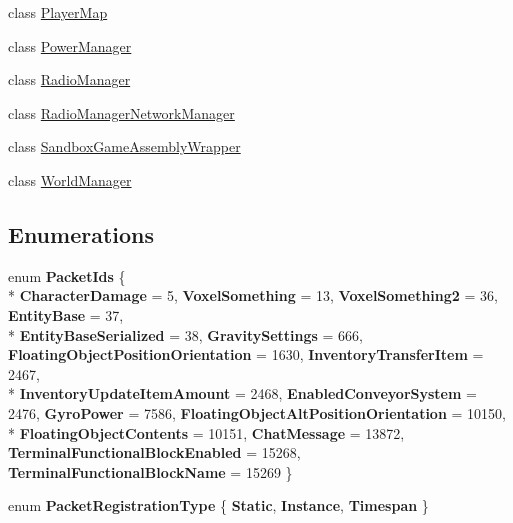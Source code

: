 \begin{DoxyCompactItemize}
\item 
class \hyperlink{class_s_e_mod_a_p_i_internal_1_1_a_p_i_1_1_common_1_1_player_map}{Player\+Map}
\item 
class \hyperlink{class_s_e_mod_a_p_i_internal_1_1_a_p_i_1_1_common_1_1_power_manager}{Power\+Manager}
\item 
class \hyperlink{class_s_e_mod_a_p_i_internal_1_1_a_p_i_1_1_common_1_1_radio_manager}{Radio\+Manager}
\item 
class \hyperlink{class_s_e_mod_a_p_i_internal_1_1_a_p_i_1_1_common_1_1_radio_manager_network_manager}{Radio\+Manager\+Network\+Manager}
\item 
class \hyperlink{class_s_e_mod_a_p_i_internal_1_1_a_p_i_1_1_common_1_1_sandbox_game_assembly_wrapper}{Sandbox\+Game\+Assembly\+Wrapper}
\item 
class \hyperlink{class_s_e_mod_a_p_i_internal_1_1_a_p_i_1_1_common_1_1_world_manager}{World\+Manager}
\end{DoxyCompactItemize}
\subsection*{Enumerations}
\begin{DoxyCompactItemize}
\item 
\hypertarget{namespace_s_e_mod_a_p_i_internal_1_1_a_p_i_1_1_common_a2b243c91436121465aa27e52d7ce7109}{}enum {\bfseries Packet\+Ids} \{ \\*
{\bfseries Character\+Damage} = 5, 
{\bfseries Voxel\+Something} = 13, 
{\bfseries Voxel\+Something2} = 36, 
{\bfseries Entity\+Base} = 37, 
\\*
{\bfseries Entity\+Base\+Serialized} = 38, 
{\bfseries Gravity\+Settings} = 666, 
{\bfseries Floating\+Object\+Position\+Orientation} = 1630, 
{\bfseries Inventory\+Transfer\+Item} = 2467, 
\\*
{\bfseries Inventory\+Update\+Item\+Amount} = 2468, 
{\bfseries Enabled\+Conveyor\+System} = 2476, 
{\bfseries Gyro\+Power} = 7586, 
{\bfseries Floating\+Object\+Alt\+Position\+Orientation} = 10150, 
\\*
{\bfseries Floating\+Object\+Contents} = 10151, 
{\bfseries Chat\+Message} = 13872, 
{\bfseries Terminal\+Functional\+Block\+Enabled} = 15268, 
{\bfseries Terminal\+Functional\+Block\+Name} = 15269
 \}\label{namespace_s_e_mod_a_p_i_internal_1_1_a_p_i_1_1_common_a2b243c91436121465aa27e52d7ce7109}

\item 
\hypertarget{namespace_s_e_mod_a_p_i_internal_1_1_a_p_i_1_1_common_ae1cebe9f6147a68e85485fe1094de3aa}{}enum {\bfseries Packet\+Registration\+Type} \{ {\bfseries Static}, 
{\bfseries Instance}, 
{\bfseries Timespan}
 \}\label{namespace_s_e_mod_a_p_i_internal_1_1_a_p_i_1_1_common_ae1cebe9f6147a68e85485fe1094de3aa}

\end{DoxyCompactItemize}
